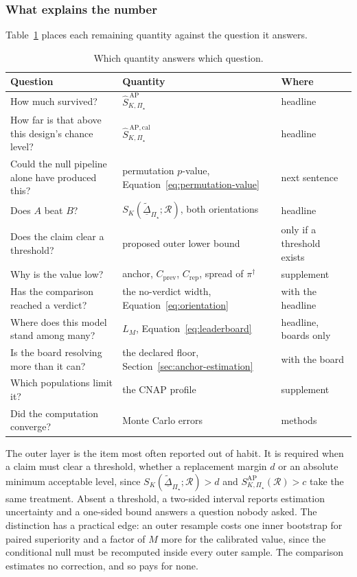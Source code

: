 \documentclass[11pt]{article}
\newcommand{\Regime}{\mathcal{R}}
\newcommand{\PSet}{\Pi_\star}
\newcommand{\SRob}{S_{K,\PSet}^{\mathrm{AP}}(\Regime)}
\newcommand{\SRobHat}{\widehat S_{K,\PSet}^{\,\mathrm{AP}}}
\newcommand{\SRobCalHat}{\widehat S_{K,\PSet}^{\,\mathrm{AP,cal}}}
\newcommand{\RobDta}{\underline{\widetilde{\Delta}}_{\PSet}}
\theoremstyle{remark}
\begin{document}
\subsubsection*{What explains the number}

Table~\ref{tab:reporting} places each remaining quantity against the question it answers.

\begin{table}[ht]
\centering
\caption{Which quantity answers which question.}
\label{tab:reporting}
\begin{tabularx}{\textwidth}{@{}XXl@{}}
\toprule
Question & Quantity & Where \\
\midrule
How much survived? & $\SRobHat$ & headline \\
How far is that above this design's chance level? & $\SRobCalHat$ & headline \\
Could the null pipeline alone have produced this? & permutation $p$-value, Equation~\eqref{eq:permutation-value} & next sentence \\
Does $A$ beat $B$? & $S_K(\RobDta;\Regime)$, both orientations & headline \\
Does the claim clear a threshold? & proposed outer lower bound & only if a threshold exists \\
Why is the value low? & anchor, $C_{\mathrm{prev}}$, $C_{\mathrm{rep}}$, spread of $\pi^\dagger$ & supplement \\
Has the comparison reached a verdict? & the no-verdict width, Equation~\eqref{eq:orientation} & with the headline \\
Where does this model stand among many? & $L_M$, Equation~\eqref{eq:leaderboard} & headline, boards only \\
Is the board resolving more than it can? & the declared floor, Section~\ref{sec:anchor-estimation} & with the board \\
Which populations limit it? & the CNAP profile & supplement \\
Did the computation converge? & Monte Carlo errors & methods \\
\bottomrule
\end{tabularx}
\end{table}

The outer layer is the item most often reported out of habit. It is required when a claim must clear a threshold, whether a replacement margin $d$ or an absolute minimum acceptable level, since $S_K(\RobDta;\Regime)>d$ and $\SRob>c$ take the same treatment. Absent a threshold, a two-sided interval reports estimation uncertainty and a one-sided bound answers a question nobody asked. The distinction has a practical edge: an outer resample costs one inner bootstrap for paired superiority and a factor of $M$ more for the calibrated value, since the conditional null must be recomputed inside every outer sample. The comparison estimates no correction, and so pays for none.
\end{document}
